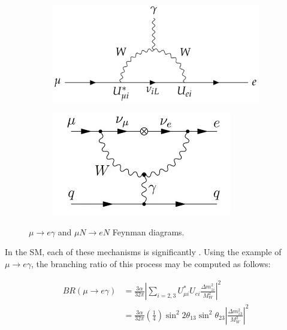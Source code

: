 \begin{figure}[!h]
     \begin{subfigure}[b]{0.4\linewidth}
         \centering
         \includegraphics[scale = 0.2]{figures/png/Screenshot_20240217_171058.png}
         \label{fig:mutoegamma}
     \end{subfigure}
     \begin{subfigure}[b]{0.7\linewidth}
         \centering
         \includegraphics[scale = 0.5]{figures/jpg/1_erkKoywyuFzJmMv4PKpc9Q.jpg}
         \label{fig:mutoeN}
     \end{subfigure}
     \caption[$\mu \rightarrow e \gamma$ and $\mu N \rightarrow e N$ Feynman diagrams.]{$\mu \rightarrow e \gamma$ and $\mu N \rightarrow e N$ Feynman diagrams.}
        \label{fig:three graphs2}
\end{figure}
In the SM, each of these mechanisms is significantly . Using the example of $\mu \rightarrow  e \gamma $, the branching ratio of this process may be computed as follows:

\begin{equation}\label{br}
\begin{aligned}
B R(\mu \rightarrow e \gamma) & =\frac{3 \alpha}{32 \pi}\left|\sum_{i=2,3} U_{\mu i}^* U_{e i} \frac{\Delta m_{1 i}^2}{M_W^2}\right|^2 \\
& =\frac{3 \alpha}{32 \pi}\left(\frac{1}{4}\right) \sin ^2 2 \theta_{13} \sin ^2 \theta_{23}\left|\frac{\Delta m_{13}^2}{M_W^2}\right|^2
\end{aligned}
\end{equation}


